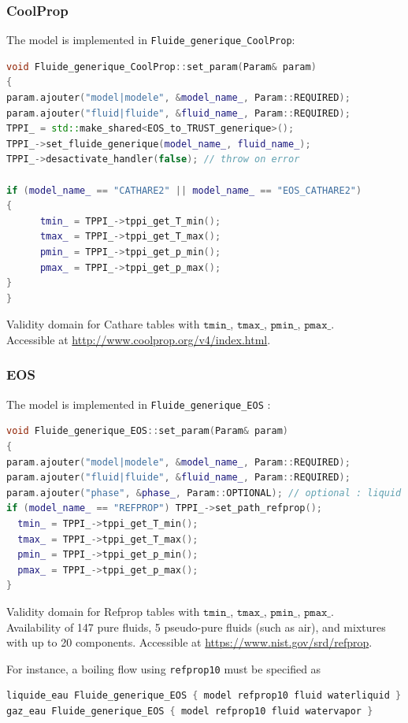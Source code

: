 \subsubsection{CoolProp}
The model is implemented in \texttt{Fluide\_generique\_CoolProp}:
\begin{lstlisting}[language=c++]
void Fluide_generique_CoolProp::set_param(Param& param)
{
param.ajouter("model|modele", &model_name_, Param::REQUIRED);
param.ajouter("fluid|fluide", &fluid_name_, Param::REQUIRED);
TPPI_ = std::make_shared<EOS_to_TRUST_generique>();
TPPI_->set_fluide_generique(model_name_, fluid_name_);
TPPI_->desactivate_handler(false); // throw on error

if (model_name_ == "CATHARE2" || model_name_ == "EOS_CATHARE2")
{
      tmin_ = TPPI_->tppi_get_T_min();
      tmax_ = TPPI_->tppi_get_T_max();
      pmin_ = TPPI_->tppi_get_p_min();
      pmax_ = TPPI_->tppi_get_p_max();
}
}
\end{lstlisting}
Validity domain for Cathare tables with $\texttt{tmin\_}$, $\texttt{tmax\_}$, $\texttt{pmin\_}$, $\texttt{pmax\_}$.\\
Accessible at \href{http://www.coolprop.org/v4/index.html}{http://www.coolprop.org/v4/index.html}.

\subsubsection{EOS}
The model is implemented in \texttt{Fluide\_generique\_EOS} :
\begin{lstlisting}[language=c++]
void Fluide_generique_EOS::set_param(Param& param)
{
param.ajouter("model|modele", &model_name_, Param::REQUIRED);
param.ajouter("fluid|fluide", &fluid_name_, Param::REQUIRED);
param.ajouter("phase", &phase_, Param::OPTIONAL); // optional : liquid or vapor. PI : specify the phase it is really useful (better perf for coolprop) !
if (model_name_ == "REFPROP") TPPI_->set_path_refprop();
  tmin_ = TPPI_->tppi_get_T_min();
  tmax_ = TPPI_->tppi_get_T_max();
  pmin_ = TPPI_->tppi_get_p_min();
  pmax_ = TPPI_->tppi_get_p_max();
}
\end{lstlisting}
Validity domain for Refprop tables with $\texttt{tmin\_}$, $\texttt{tmax\_}$, $\texttt{pmin\_}$, $\texttt{pmax\_}$.\\ Availability of 147 pure fluids, 5 pseudo-pure fluids (such as air), and mixtures with up to 20 components. Accessible at \href{https://www.nist.gov/srd/refprop}{https://www.nist.gov/srd/refprop}.

For instance, a boiling flow using \texttt{refprop10} must be specified as
\begin{lstlisting}[language=c++]
liquide_eau Fluide_generique_EOS { model refprop10 fluid waterliquid } 
gaz_eau Fluide_generique_EOS { model refprop10 fluid watervapor } 
\end{lstlisting}

